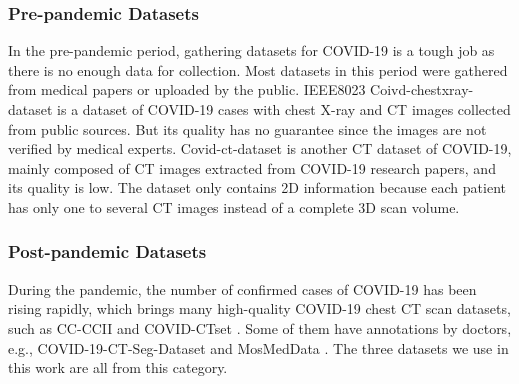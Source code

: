\documentclass[letterpaper]{article}
\begin{document}
\subsubsection{Pre-pandemic Datasets}
In the pre-pandemic period, gathering datasets for COVID-19 is a tough job as there is no enough data for collection. Most datasets in this period were gathered from medical papers or uploaded by the public. IEEE8023 Coivd-chestxray-dataset \cite{cohen2020covid} is a dataset of COVID-19 cases with chest X-ray and CT images collected from public sources. But its quality has no guarantee since the images are not verified by medical experts. Covid-ct-dataset \cite{zhao2020covidctdataset} is another CT dataset of COVID-19, mainly composed of CT images extracted from COVID-19 research papers, and its quality is low. The dataset only contains 2D information because each patient has only one to several CT images instead of a complete 3D scan volume.

\subsubsection{Post-pandemic Datasets}
During the pandemic, the number of confirmed cases of COVID-19 has been rising rapidly, which brings many high-quality COVID-19 chest CT scan datasets, such as CC-CCII \cite{cell_covid} and COVID-CTset \cite{covid-ctset}. Some of them have annotations by doctors, e.g., COVID-19-CT-Seg-Dataset \cite{COVID-19-CT-Seg-Dataset} and MosMedData \cite{mosmeddata}. The three datasets we use in this work are all from this category.


\end{document}
